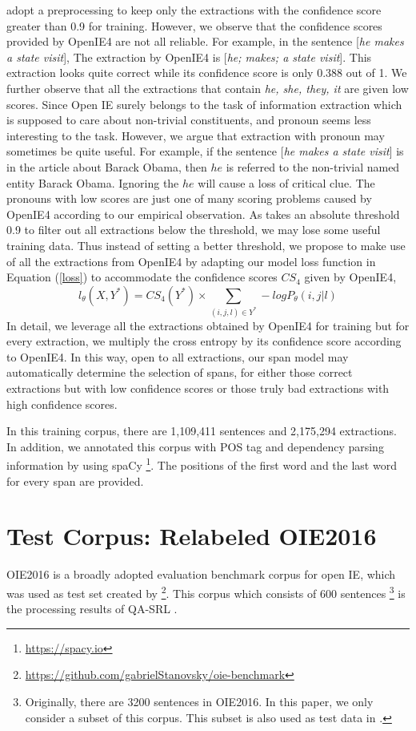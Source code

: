 \documentclass[letterpaper]{article} %
\begin{document}
\cite{Cui2018NeuralOI} adopt a preprocessing to keep only the extractions with the confidence score greater than 0.9 for training. However, we observe that the confidence scores provided by OpenIE4 are not all reliable. For example, in the sentence [\emph{he makes a state visit}], The extraction by OpenIE4 is [\emph{he; makes; a state visit}]. This extraction looks quite correct while its confidence score is only 0.388 out of 1. We further observe that all the extractions that contain \emph{he, she, they, it} are given low scores. Since Open IE surely belongs to the task of information extraction which is supposed to care about non-trivial constituents, and pronoun seems less interesting to the task. However, we argue that extraction with pronoun may sometimes be quite useful. For example, if the sentence [\emph{he makes a state visit}] is in the article about Barack Obama, then $he$ is referred to the non-trivial named entity Barack Obama. Ignoring the $he$ will cause a loss of critical clue. The pronouns with low scores are just one of many scoring problems caused by OpenIE4 according to our empirical observation. As \cite{Cui2018NeuralOI} takes an absolute threshold 0.9 to filter out all extractions below the threshold, we may lose some useful training data. Thus instead of setting a better threshold, we propose to make use of all the extractions from OpenIE4 by adapting our model loss function in Equation (\ref{loss}) to accommodate the confidence scores $CS_4$ given by OpenIE4,
\begin{equation}
        l_\theta(X,Y^*)=CS_4(Y^*)\times
        \sum_{(i,j,l)\in Y^*} -log P_{\theta}(i,j|l)
\end{equation}
In detail, we leverage all the extractions obtained by OpenIE4 for training but for every extraction, we multiply the cross entropy by its confidence score according to OpenIE4. In this way, open to all extractions, our span model may automatically determine the selection of spans, for either those correct extractions but with low confidence scores or those truly bad extractions with high confidence scores.

In this training corpus, there are 1,109,411 sentences and 2,175,294 extractions. In addition, we annotated this corpus with POS tag and dependency parsing information by using spaCy \footnote{\url{https://spacy.io}}. The positions of the first word and the last word for every span are provided.

\section{Test Corpus: Relabeled OIE2016}
OIE2016 is a broadly adopted evaluation benchmark corpus for open IE, which was used as test set created by \cite{Stanovsky2016CreatingAL}\footnote{\url{https://github.com/gabrielStanovsky/oie-benchmark}}. This corpus which consists of 600 sentences \footnote{Originally, there are 3200 sentences in OIE2016. In this paper, we only consider a subset of this corpus. This subset is also used as test data in \cite{Stanovsky2018SupervisedOI}.} is the processing results of QA-SRL \cite{He2015QuestionAnswerDS}.
\end{document}
